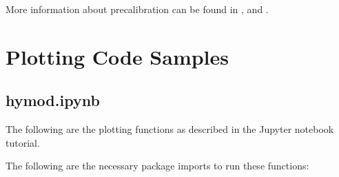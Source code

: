 \documentclass[letterpaper,10pt,english]{book}
\begin{document}
\sphinxAtStartPar
More information about pre\sphinxhyphen{}calibration can be found in ,
and .


\chapter{Plotting Code Samples}
\label{\detokenize{A3_plotting_code:plotting-code-samples}}\label{\detokenize{A3_plotting_code::doc}}

\section{hymod.ipynb}
\label{\detokenize{A3_plotting_code:hymod-ipynb}}
\sphinxAtStartPar
The following are the plotting functions as described in the  Jupyter notebook tutorial.

\sphinxAtStartPar
The following are the necessary package imports to run these functions:

\begin{sphinxVerbatim}[commandchars=\\\{\}]
   
   
   

   
\end{sphinxVerbatim}
\end{document}
